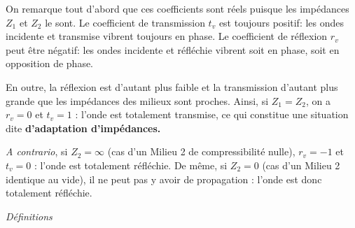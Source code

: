 \documentclass[a4paper, 12pt]{article}
\begin{document}
On remarque tout d'abord que ces coefficients sont réels puisque les impédances $Z_{1}$ et $Z_{2}$ le sont. Le coefficient de transmission $t_{v}$ est toujours positif: les ondes incidente et transmise vibrent toujours en phase. Le coefficient de réflexion $r_{v}$ peut être négatif: les ondes incidente et réfléchie vibrent soit en phase, soit en opposition de phase.

En outre, la réflexion est d'autant plus faible et la transmission d'autant plus grande que les impédances des milieux sont proches. Ainsi, si $Z_{1}=Z_{2}$, on a $r_{v} = 0$ et $t_{v} = 1$ : l'onde est totalement transmise, ce qui constitue une situation dite \textbf{d'adaptation d'impédances.}

\textit{A contrario}, si $Z_{2} = \infty$ (cas d'un Milieu 2 de compressibilité nulle), $r_{v} = -1$ et $t_{v} = 0$ : l'onde est totalement réfléchie. De même, si $Z_{2} = 0$ (cas d'un Milieu 2 identique au vide), il ne peut pas y avoir de propagation : l'onde est donc totalement réfléchie.

\textit{Définitions}

\noindent{}
\end{document}
